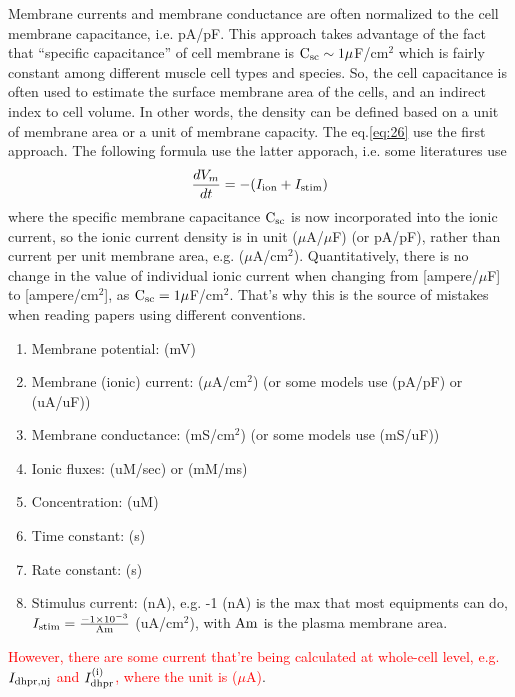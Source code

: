 \begin{framed}
Membrane currents and membrane conductance are often normalized to the
cell membrane capacitance, i.e. pA/pF. This approach takes advantage
of the fact that ``specific capacitance'' of cell membrane is
${\text{C}_\text{sc}}\sim 1\mu$F/cm$^2$ which is fairly constant among different
muscle cell types and species.  So, the cell capacitance is often used
to estimate the surface membrane area of the cells, and an indirect
index to cell volume. 
In other words, the density can be defined based on a unit of membrane area or a
unit of membrane capacity. The eq.\ref{eq:26} use the first approach. The
following formula use the latter apporach, i.e. some literatures use 
  \begin{equation}
    \label{eq:27}
    \frac{dV_m}{dt} = -( I_{\text{ion}} + I_{\text{stim}}) 
  \end{equation}
  where the specific membrane capacitance ${\text{C}_\text{sc}}$ is now incorporated
  into the ionic current, so the ionic current density is in unit
  ($\mu$A/$\mu$F) (or pA/pF), rather than current per unit membrane area,
  e.g. ($\mu$A/cm$^2$). Quantitatively, there is no change in the value of
  individual ionic current when changing from [ampere/$\mu$F] to
  [ampere/cm$^2$], as ${\text{C}_\text{sc}}=1\mu$F/cm$^2$. That's why this is the source of
  mistakes when reading papers using different conventions.
\end{framed}


\begin{enumerate}
\item Membrane potential: (mV)
\item Membrane (ionic) current: ($\mu$A/cm$^2$)  (or some models use (pA/pF) or (uA/uF))
\item Membrane conductance: (mS/cm$^2$)          (or some models use (mS/uF))
\item Ionic fluxes: (uM/sec) or (mM/ms)
\item Concentration: (uM)
\item Time constant: (s)
\item Rate constant: (s)
\item Stimulus current: (nA), e.g. -1 (nA) is the max that most equipments
  can do, $I_{\text{stim}}=\frac{-1\times 10^{-3}}{{\text{Am}}}$ (uA/cm$^2$), with ${\text{Am}}$ is the
  plasma membrane area. 
\end{enumerate}

\textcolor{red}{However, there are some current that're being
  calculated at whole-cell level, e.g. $I_{\text{dhpr},{\text{nj}}}$ and
  $I_{\text{dhpr}}^{\text{(i)}}$, where the unit is ($\mu$A)}.





